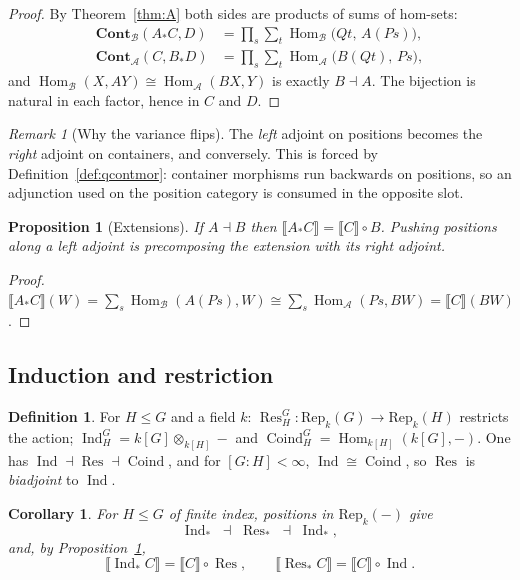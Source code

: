 \documentclass[11pt,a4paper]{article}
\newtheorem{proposition}[theorem]{Proposition}
\newtheorem{corollary}[theorem]{Corollary}
\theoremstyle{definition}
\newtheorem{definition}[theorem]{Definition}
\theoremstyle{remark}
\newtheorem{remark}[theorem]{Remark}
\newcommand{\cat}[1]{\mathbf{#1}}
\newcommand{\Cont}{\cat{Cont}}
\newcommand{\Rep}{\mathrm{Rep}}
\newcommand{\ext}[1]{\llbracket #1 \rrbracket}
\DeclareMathOperator{\Hom}{Hom}
\DeclareMathOperator{\Ind}{Ind}
\DeclareMathOperator{\Res}{Res}
\DeclareMathOperator{\Coind}{Coind}
\begin{document}
\begin{proof}
By Theorem~\ref{thm:A} both sides are products of sums of hom-sets:
\begin{align*}
  \Cont_{\mathcal{B}}(A_{*}C, D) &= \prod_{s}\sum_{t} \Hom_{\mathcal{B}}\bigl(Q t,\, A(P s)\bigr), \\
  \Cont_{\mathcal{A}}(C, B_{*}D) &= \prod_{s}\sum_{t} \Hom_{\mathcal{A}}\bigl(B(Q t),\, P s\bigr),
\end{align*}
and $\Hom_{\mathcal{B}}(X, A Y) \cong \Hom_{\mathcal{A}}(B X, Y)$ is exactly
$B \dashv A$. The bijection is natural in each factor, hence in $C$ and $D$.
\end{proof}

\begin{remark}[Why the variance flips]
The \emph{left} adjoint on positions becomes the \emph{right} adjoint on
containers, and conversely. This is forced by Definition~\ref{def:qcontmor}:
container morphisms run backwards on positions, so an adjunction used on the
position category is consumed in the opposite slot.
\end{remark}

\begin{proposition}[Extensions]\label{prop:extadj}
If $A \dashv B$ then $\ext{A_{*}C} = \ext{C} \circ B$. Pushing positions along a
left adjoint is precomposing the extension with its right adjoint.
\end{proposition}

\begin{proof}
$\ext{A_{*}C}(W) = \sum_s \Hom_{\mathcal{B}}(A(P s), W) \cong \sum_s
\Hom_{\mathcal{A}}(P s, B W) = \ext{C}(B W)$.
\end{proof}

\subsection{Induction and restriction}

\begin{definition}
For $H \leq G$ and a field $k$: $\Res^G_H : \Rep_k(G) \to \Rep_k(H)$ restricts the
action; $\Ind_H^G = k[G] \otimes_{k[H]} - $ and $\Coind_H^G = \Hom_{k[H]}(k[G], -)$.
One has $\Ind \dashv \Res \dashv \Coind$, and for $[G:H] < \infty$,
$\Ind \cong \Coind$, so $\Res$ is \emph{biadjoint} to $\Ind$.
\end{definition}

\begin{corollary}\label{cor:indres}
For $H \leq G$ of finite index, positions in $\Rep_k(-)$ give
\[
  \Ind_{*} \;\dashv\; \Res_{*} \;\dashv\; \Ind_{*},
\]
and, by Proposition~\ref{prop:extadj},
\[
  \ext{\Ind_{*}C} = \ext{C} \circ \Res,
  \qquad
  \ext{\Res_{*}C} = \ext{C} \circ \Ind .
\]
\end{corollary}
\end{document}
